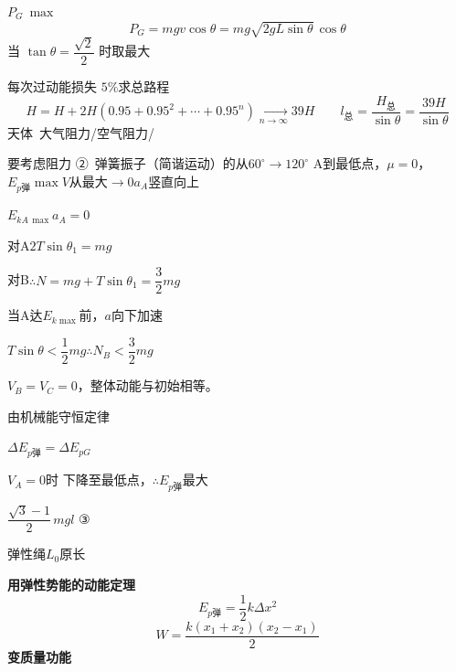 $P_{G}\ \max$
\[
P_{G}=mgv\cos\theta=mg\sqrt{2gL\sin\theta}\,\cos\theta
\]
当 $\tan\theta=\dfrac{\sqrt{2}}{2}$ 时取最大

每次过动能损失 $5\%$\quad 求总路程
\[
H=H+2H(0.95+0.95^{2}+\cdots+0.95^{n})\xrightarrow[n\to\infty]{}39H
\qquad l_{\text{总}}=\frac{H_{\text{总}}}{\sin\theta}=\frac{39H}{\sin\theta}
\]
天体\ 大气阻力\quad /\quad 空气阻力\quad /\quad \uline{}

要考虑阻力
②\ 弹簧振子（简谐运动）的从$60^\circ\to120^\circ$ A到最低点，$\mu=0$，\quad $E_{p\text{弹}}\max$\quad $V$从最大$\to0$\quad $a_A$竖直向上

$E_{kA\,\max}$\quad $a_A=0$

对A\quad $2T\sin\theta_1=mg$

对B\quad $\therefore N=mg+T\sin\theta_1=\dfrac{3}{2}mg$

当A达$E_{k\max}$前，$a$向下加速

$T\sin\theta<\dfrac{1}{2}mg$\quad $\therefore N_B<\dfrac{3}{2}mg$

$V_B=V_C=0$，整体动能与初始相等。

由机械能守恒定律

$\Delta E_{p\text{弹}}=\Delta E_{pG}$

$V_A=0$时 下降至最低点，$\therefore E_{p\text{弹}}$最大

$\dfrac{\sqrt{3}-1}{2}\,mgl$
③

弹性绳\quad $L_0$原长


\textbf{用弹性势能的动能定理}
\[
E_{p\text{弹}}=\dfrac{1}{2}k\Delta x^2
\]
\[
W=\dfrac{k(x_1+x_2)(x_2-x_1)}{2}
\]
\textbf{变质量功能}

